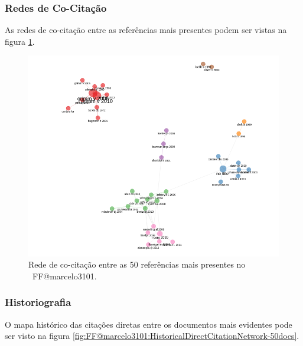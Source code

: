\subsubsection{Redes de Co-Citação}

As redes de co-citação entre as referências mais presentes podem ser vistas na figura \ref{fig:FF@marcelo3101:CoCitation-Network}.

\begin{figure}
    \centering
    \includegraphics[width=1\textwidth]{exploratory-data-analysis/marcelo3101/PesqBibliogr/ForestFire/WoS-20221204/assets/CocitationNetwork.png}
    \caption{Rede de co-citação entre as 50 referências mais presentes no  \dataset\ FF@marcelo3101.}
    \label{fig:FF@marcelo3101:CoCitation-Network}
\end{figure}

\subsubsection{Historiografia}

O mapa histórico das citações diretas entre os documentos mais evidentes pode ser visto na figura \ref{fig:FF@marcelo3101:HistoricalDirectCitationNetwork-50docs}.

